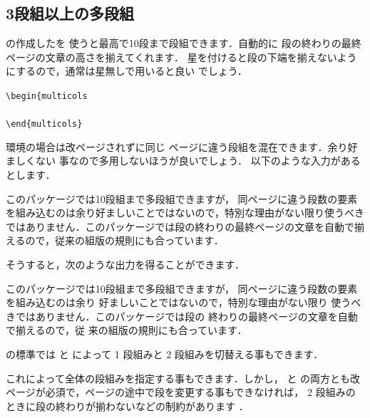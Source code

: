 \subsection{3段組以上の多段組\zdash{}}
の作成したを
使うと最高で10段まで段組できます．自動的に
段の終わりの最終ページの文章の高さを揃えてくれます．
星を付けると段の下端を揃えないようにするので，通常は星無しで用いると良い
でしょう．
\begin{Syntax}
\verb|\begin{multicols|\\
\\
\verb|\end{multicols}| 
\end{Syntax}
環境の場合は改ページされずに同じ
ページに違う段組を混在できます．余り好ましくない
事なので多用しないほうが良いでしょう．
以下のような入力があるとします．

\begin{InTeX}
\begin{multicols}{4}
このパッケージでは10段組まで多段組できますが， 同ページに違う段数の要素
を組み込むのは余り好ましいことではないので，特別な理由がない限り使うべき
ではありません．このパッケージでは段の終わりの最終ページの文章を自動で揃
えるので，従来の組版の規則にも合っています．
\end{multicols} 
\end{InTeX}

そうすると，次のような出力を得ることができます．

\begin{multicols}{4}
このパッケージでは10段組まで多段組できますが， 
同ページに違う段数の要素を組み込むのは余り
好ましいことではないので，特別な理由がない限り
使うべきではありません．このパッケージでは段の
終わりの最終ページの文章を自動で揃えるので，従
来の組版の規則にも合っています．
\end{multicols} 

\LaTeXe の標準では  と  によって 1 段組みと 2
段組みを切替える事もできます．


これによって全体の段組みを指定する事もできます．しかし，  と 
の両方とも改ページが必須で，ページの途中で段を変更する事もできなければ，
2 段組みのときに段の終わりが揃わないなどの制約があります ．

